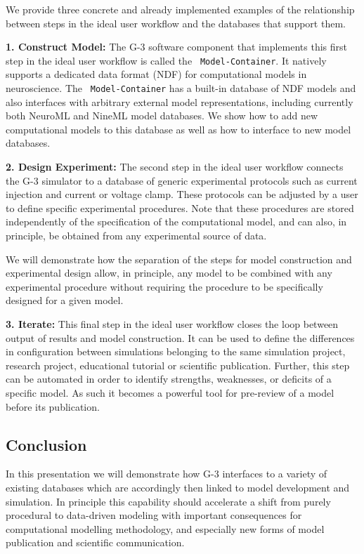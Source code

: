 \documentclass[12pt]{article}
\begin{document}
We provide three concrete and already implemented examples of the
relationship between steps in the ideal user workflow and the
databases that support them.

{\bf 1. Construct Model:} The G-3 software component that implements
this first step in the ideal user workflow is called the {\tt
  Model-Container}.  It natively supports a dedicated data format
(NDF) for computational models in neuroscience.  The {\tt
  Model-Container} has a built-in database of NDF models and also
interfaces with arbitrary external model representations, including
currently both NeuroML and NineML model databases.  We show how to add
new computational models to this database as well as how to interface
to new model databases.

{\bf 2. Design Experiment:} The second step in the ideal user workflow
connects the G-3 simulator to a database of generic experimental
protocols such as current injection and current or voltage clamp.
These protocols can be adjusted by a user to define specific
experimental procedures.  Note that these procedures are stored
independently of the specification of the computational model, and can
also, in principle, be obtained from any experimental source of data.

We will demonstrate how the separation of the steps for model
construction and experimental design allow, in principle, any model to
be combined with any experimental procedure without requiring the
procedure to be specifically designed for a given model.


{\bf 3. Iterate:} This final step in the ideal user workflow closes
the loop between output of results and model construction.  It can be
used to define the differences in configuration between simulations
belonging to the same simulation project, research project,
educational tutorial or scientific publication.  Further, this step
can be automated in order to identify strengths, weaknesses, or
deficits of a specific model.  As such it becomes a powerful tool for
pre-review of a model before its publication.

\subsection*{Conclusion}

In this presentation we will demonstrate how G-3 interfaces to a
variety of existing databases which are accordingly then linked to
model development and simulation.  In principle this capability should
accelerate a shift from purely procedural to data-driven modeling with
important consequences for computational modelling methodology, and
especially new forms of model publication and scientific
communication.
\end{document}
